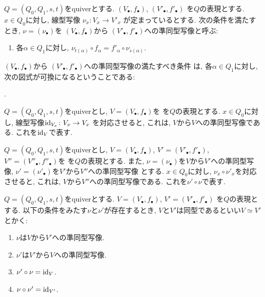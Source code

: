 \begin{definition}
  $Q=(Q_0,Q_1,s,t)$をquiverとする.
  $(V_\bullet,f_\bullet)$,
  $(V'_\bullet,f'_\bullet)$
  を$Q$の表現とする.
  $x\in Q_0$に対し,
  線型写像
  $\nu_x\colon V_x \to V'_x$
  が定まっているとする.
  次の条件を満たすとき,
  $\nu=(\nu_\bullet)$を
  $(V_\bullet,f_\bullet)$から
  $(V'_\bullet,f'_\bullet)$への準同型写像と呼ぶ:
  \begin{enumerate}
  \item
    \label{def:hom:rep:quiver:item}
    各$\alpha\in Q_1$に対し,
    $\nu_{t(\alpha)}\circ f_{\alpha}=f'_{\alpha}\circ \nu_{s(\alpha)}$.
  \end{enumerate}
\end{definition}
\begin{remark}
  $(V_\bullet,f_\bullet)$から
  $(V'_\bullet,f'_\bullet)$への準同型写像の満たすべき条件
  は,  
  各$\alpha\in Q_1$に対し,
  次の図式が可換になるということである:
  \begin{center}
  .
\end{center}
\end{remark}
\begin{example}
  $Q=(Q_0,Q_1,s,t)$をquiverとし,
  $V=(V_\bullet,f_\bullet)$を
  を$Q$の表現とする.
  $x\in Q_0$に対し,
  線型写像$\operatorname{id}_{V_x}\colon  V_x \to V_x$
  を対応させると, これは, $V$から$V$への準同型写像である.
  これを$\operatorname{id}_{V}$で表す.
\end{example}
\begin{example}
  $Q=(Q_0,Q_1,s,t)$をquiverとし,
  $V=(V_\bullet,f_\bullet)$,
  $V'=(V'_\bullet,f'_\bullet)$,
  $V''=(V''_\bullet,f''_\bullet)$を
  を$Q$の表現とする.
  また,
  $\nu=(\nu_\bullet)$を$V$から$V'$への準同型写像,
  $\nu'=(\nu'_\bullet)$を$V'$から$V''$への準同型写像
  とする.
  $x\in Q_0$に対し, $\nu_x\circ \nu'_{x}$を対応させると,
  これは, $V$から$V''$への準同型写像である.
  これを$\nu'\circ\nu$で表す.
\end{example}

\begin{definition}
  $Q=(Q_0,Q_1,s,t)$をquiverとする.
  $V=(V_\bullet,f_\bullet)$,
  $V'=(V'_\bullet,f'_\bullet)$
  を$Q$の表現とする.
  以下の条件をみたす$\nu$と$\nu'$が存在するとき, $V$と$V'$は同型であるといい$V\simeq V'$とかく:
  \begin{enumerate}
  \item $\nu$は$V$から$V'$への準同型写像.
  \item $\nu'$は$V'$から$V$への準同型写像.
  \item $\nu'\circ\nu=\operatorname{id}_V$.
  \item $\nu\circ\nu'=\operatorname{id}_{V'}$.
  \end{enumerate}
\end{definition}

